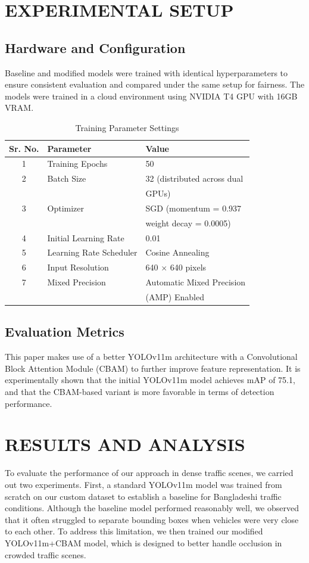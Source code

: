 \documentclass[conference]{IEEEtran}
\begin{document}
\section{EXPERIMENTAL SETUP}

\subsection{Hardware and Configuration}

Baseline and modified models were trained with identical hyperparameters to ensure consistent evaluation and compared under the same setup for fairness. The models were trained in a cloud environment using NVIDIA T4 GPU with 16GB VRAM. 
\begin{table}[h]
\centering
\caption{Training Parameter Settings}
\label{tab:param}
\begin{tabular}{|c|l|l|}
\hline
\textbf{Sr. No.} & \textbf{Parameter} & \textbf{Value} \\ 
\hline
1 & Training Epochs & 50 \\ 
\hline
2 & Batch Size & 32 (distributed across dual \\ 
&&  GPUs)\\
\hline
3 & Optimizer & SGD (momentum = 0.937\\ 
&&  weight decay = 0.0005) \\
\hline
4 & Initial Learning Rate & 0.01 \\ 
\hline
5 & Learning Rate Scheduler & Cosine Annealing \\ 
\hline
6 & Input Resolution & 640 $\times$ 640 pixels \\ 
\hline
7 & Mixed Precision & Automatic Mixed Precision  \\ 
&&(AMP) Enabled\\
\hline
\end{tabular}
\end{table}

\subsection{Evaluation Metrics}This paper makes use of a better YOLOv11m architecture with a Convolutional Block Attention Module (CBAM) to further improve feature representation. It is experimentally shown that the initial YOLOv11m model achieves mAP of 75.1, and that the CBAM-based variant is more favorable in terms of detection performance.


\section{RESULTS AND ANALYSIS}
To evaluate the performance of our approach in dense traffic scenes, we carried out two experiments. First, a standard YOLOv11m model was trained from scratch on our custom dataset to establish a baseline for Bangladeshi traffic conditions. Although the baseline model performed reasonably well, we observed that it often struggled to separate bounding boxes when vehicles were very close to each other. To address this limitation, we then trained our modified YOLOv11m+CBAM model, which is designed to better handle occlusion in crowded traffic scenes.
\end{document}
